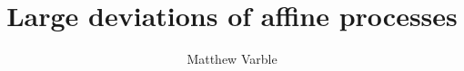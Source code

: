 \title{Large deviations of affine processes}
\author{Matthew Varble}




\maketitle

\approvalpage

\begin{abstract}
  \label{frontmatter:abstract}
  
\end{abstract}

\begin{acknowledgements}
  \label{frontmatter:acknowledgements}
  
\end{acknowledgements}

\tableofcontents

\begin{notation}
  \label{frontmatter:notation}
  \label{frontmatter:notation}
  
\end{notation}
